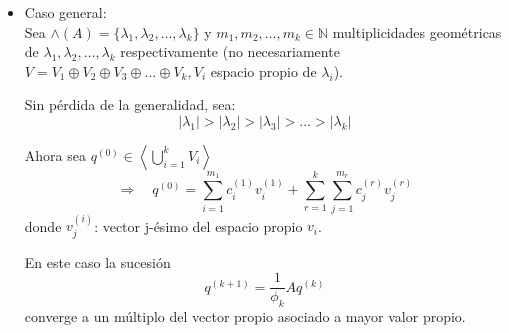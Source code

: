 \documentclass[12pt,a4paper]{article}
\newcommand{\ds}{\displaystyle}
\begin{document}
\begin{multicols}{2}
\begin{itemize}

    

\item Caso general:\\
Sea $\wedge(A)=\{\lambda_{1},\lambda_{2},\ldots ,\lambda_{k}\}$ y $m_{1},m_{2}, \ldots , m_{k}\in\mathbb{N}$ multiplicidades geométricas de $\lambda_{1},\lambda_{2},\ldots ,\lambda_{k}$ respectivamente (no necesariamente $V=V_{1}\oplus V_{2}\oplus V_{3}\oplus\ldots\oplus V_{k}, V_{i}$ espacio propio de $\lambda_{i}$).
	
Sin pérdida de la generalidad, sea:
$$\vert\lambda_{1}\vert > \vert\lambda_{2}\vert > \vert\lambda_{3}\vert > \ldots>\vert\lambda_{k}\vert$$
	
Ahora sea $q^{(0)}\in\left<\bigcup_{i=1}^{k}V_{i}\right>$
$$\Rightarrow\quad q^{(0)} = \sum_{i=1}^{m_{1}}c_{i}^{(1)}v_{i}^{(1)} + \sum_{r=1}^{k}\sum_{j=1}^{m_{r}}c_{j}^{(r)}v_{j}^{(r)}$$
donde $v_{j}^{(i)}$: vector j-ésimo del espacio propio $v_{i}$.



En este caso la sucesión $$q^{(k+1)}=\frac{1}{\phi_{k}}Aq^{(k)}$$ converge a un múltiplo del vector propio asociado a mayor valor propio.\\
\end{itemize}


\end{multicols}
\end{document}
